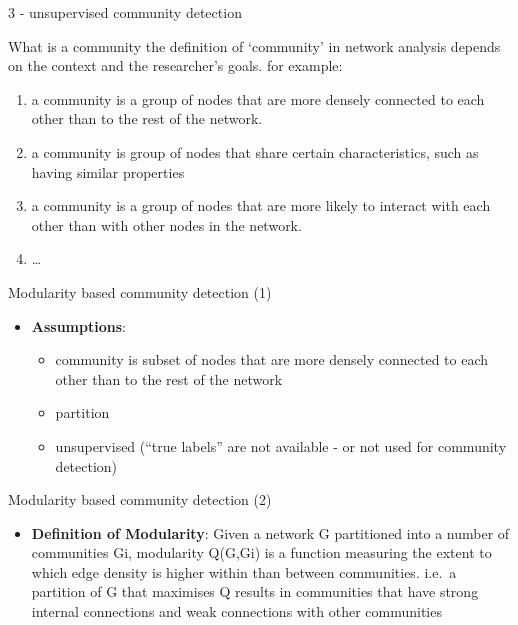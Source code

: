 \documentclass[
  ignorenonframetext,
]{beamer}
\providecommand{\tightlist}{%
  \setlength{\itemsep}{0pt}\setlength{\parskip}{0pt}}
\begin{document}
\begin{frame}{3 - unsupervised community detection}
\protect\hypertarget{unsupervised-community-detection}{}
\begin{block}{What is a community}
\protect\hypertarget{what-is-a-community}{}
the definition of `community' in network analysis depends on the context
and the researcher's goals. for example:

\begin{enumerate}
\item
  a community is a group of nodes that are more densely connected to
  each other than to the rest of the network.
\item
  a community is group of nodes that share certain characteristics, such
  as having similar properties
\item
  a community is a group of nodes that are more likely to interact with
  each other than with other nodes in the network.
\item
  \ldots{}
\end{enumerate}
\end{block}

\begin{block}{Modularity based community detection (1)}
\protect\hypertarget{modularity-based-community-detection-1}{}
\begin{itemize}
\item
  \textbf{Assumptions}:

  \begin{itemize}
  \item
    community is subset of nodes that are more densely connected to each
    other than to the rest of the network
  \item
    partition
  \item
    unsupervised (``true labels'' are not available - or not used for
    community detection)
  \end{itemize}
\end{itemize}
\end{block}

\begin{block}{Modularity based community detection (2)}
\protect\hypertarget{modularity-based-community-detection-2}{}
\begin{itemize}
\tightlist
\item
  \textbf{Definition of Modularity}: Given a network G partitioned into
  a number of communities Gi, modularity Q(G,Gi) is a function measuring
  the extent to which edge density is higher within than between
  communities. i.e.~a partition of G that maximises Q results in
  communities that have strong internal connections and weak connections
  with other communities
\end{itemize}


\end{block}
\end{frame}
\end{document}
